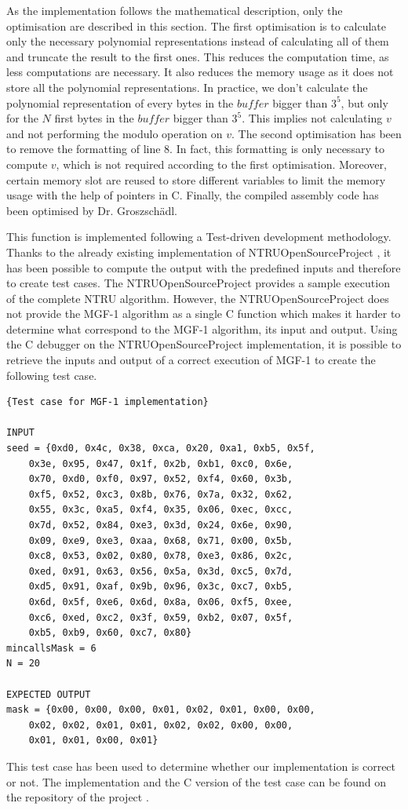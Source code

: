 As the implementation follows the mathematical description, only the optimisation are described in this section.
The first optimisation is to calculate only the necessary polynomial representations instead of calculating all of them and truncate the result to the first ones. This reduces the computation time, as less computations are necessary. It also reduces the memory usage as it does not store all the polynomial representations. In practice, we don't calculate the polynomial representation of every bytes in the $buffer$ bigger than $3^5$, but only for the $N$ first bytes in the $buffer$ bigger than $3^5$. This implies not calculating $v$ and not performing the modulo operation on $v$.
The second optimisation has been to remove the formatting of line 8. In fact, this formatting is only necessary to compute $v$, which is not required according to the first optimisation.
Moreover, certain memory slot are reused to store different variables to limit the memory usage with the help of pointers in C.
Finally, the compiled assembly code has been optimised by Dr. Groszsch\"adl.


This function is implemented following a Test-driven development methodology. Thanks to the already existing implementation of NTRUOpenSourceProject \cite{noauthor_open_2018}, it has been possible to compute the output with the predefined inputs and therefore to create test cases. The NTRUOpenSourceProject provides a sample execution of the complete NTRU algorithm. However, the NTRUOpenSourceProject does not provide the MGF-1 algorithm as a single C function which makes it harder to determine what correspond to the MGF-1 algorithm, its input and output. Using the C debugger on the NTRUOpenSourceProject implementation, it is possible to retrieve the inputs and output of a correct execution of MGF-1 to create the following test case.
\newpage
\begin{lstlisting}[style=base,frame=single,mathescape=true]
{Test case for MGF-1 implementation}

INPUT 
seed = {0xd0, 0x4c, 0x38, 0xca, 0x20, 0xa1, 0xb5, 0x5f,
	0x3e, 0x95, 0x47, 0x1f, 0x2b, 0xb1, 0xc0, 0x6e,
	0x70, 0xd0, 0xf0, 0x97, 0x52, 0xf4, 0x60, 0x3b,
	0xf5, 0x52, 0xc3, 0x8b, 0x76, 0x7a, 0x32, 0x62,
	0x55, 0x3c, 0xa5, 0xf4, 0x35, 0x06, 0xec, 0xcc,
	0x7d, 0x52, 0x84, 0xe3, 0x3d, 0x24, 0x6e, 0x90,
	0x09, 0xe9, 0xe3, 0xaa, 0x68, 0x71, 0x00, 0x5b,
	0xc8, 0x53, 0x02, 0x80, 0x78, 0xe3, 0x86, 0x2c,
	0xed, 0x91, 0x63, 0x56, 0x5a, 0x3d, 0xc5, 0x7d,
	0xd5, 0x91, 0xaf, 0x9b, 0x96, 0x3c, 0xc7, 0xb5,
	0x6d, 0x5f, 0xe6, 0x6d, 0x8a, 0x06, 0xf5, 0xee,
	0xc6, 0xed, 0xc2, 0x3f, 0x59, 0xb2, 0x07, 0x5f,
	0xb5, 0xb9, 0x60, 0xc7, 0x80}
mincallsMask = 6
N = 20

EXPECTED OUTPUT
mask = {0x00, 0x00, 0x00, 0x01, 0x02, 0x01, 0x00, 0x00, 
	0x02, 0x02, 0x01, 0x01, 0x02, 0x02, 0x00, 0x00,
	0x01, 0x01, 0x00, 0x01}
\end{lstlisting}

This test case has been used to determine whether our implementation is correct or not. The implementation and the C version of the test case can be found on the repository of the project \cite{simonetto_ntru_2018}.







